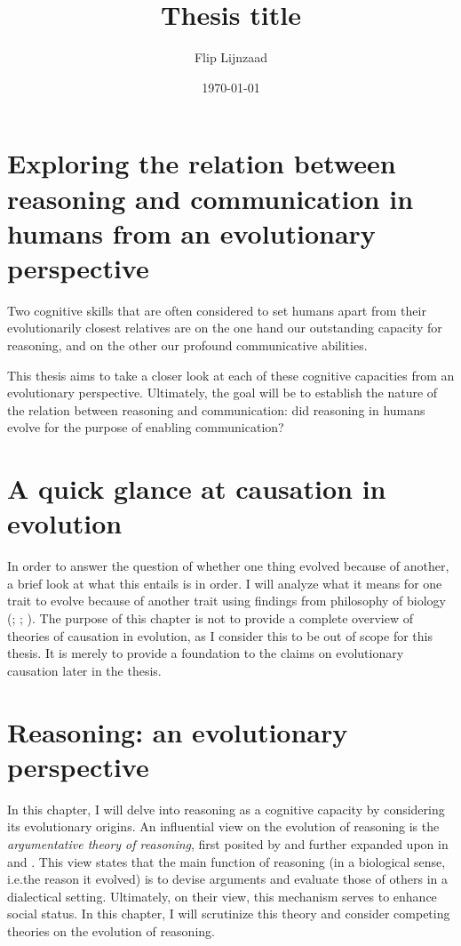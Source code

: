 \documentclass{article}
\title{Thesis title}
\author{Flip Lijnzaad}
\date{\today}
\begin{document}
\section*{\centering Exploring the relation between reasoning and communication in humans from an evolutionary perspective}

Two cognitive skills that are often considered to set humans apart from their evolutionarily closest relatives are on the one hand our outstanding capacity for reasoning, and on the other our profound communicative abilities.

This thesis aims to take a closer look at each of these cognitive capacities from an evolutionary perspective. Ultimately, the goal will be to establish the nature of the relation between reasoning and communication: did reasoning in humans evolve for the purpose of enabling communication?

\section{A quick glance at causation in evolution}

In order to answer the question of whether one thing evolved because of another, a brief look at what this entails is in order.
I will analyze what it means for one trait to evolve because of another trait using findings from philosophy of biology (\citet{Ayala99}; \citet{Allen98}; \citet{Wright76}).
The purpose of this chapter is not to provide a complete overview of theories of causation in evolution, as I consider this to be out of scope for this thesis. It is merely to provide a foundation to the claims on evolutionary causation later in the thesis.

\section{Reasoning: an evolutionary perspective}

In this chapter, I will delve into reasoning as a cognitive capacity by considering its evolutionary origins.
An influential view on the evolution of reasoning is the \emph{argumentative theory of reasoning}, first posited by \citet{MS11} and further expanded upon in \citet{Mercier16} and \citet{MS17}. This view states that the main function of reasoning (in a biological sense, i.e.\@ the reason it evolved) is to devise arguments and evaluate those of others in a dialectical setting. Ultimately, on their view, this mechanism serves to enhance social status. In this chapter, I will scrutinize this theory and consider competing theories on the evolution of reasoning.
\end{document}
